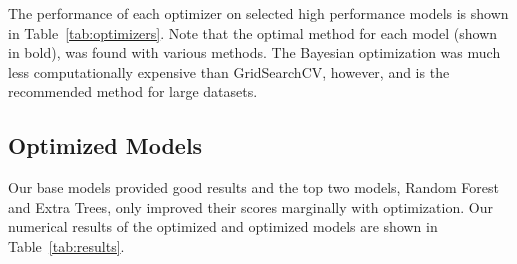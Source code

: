 \documentclass[twocolumn, nofootinbib, secnumarabic, amssymb, nobibnotes, aps, prd]{revtex4-2}
\begin{document}
The performance of each optimizer on selected high performance models is shown in Table~\ref{tab:optimizers}. Note that the optimal method for each model (shown in bold), was found with various methods. The Bayesian optimization was much less computationally expensive than GridSearchCV, however, and is the recommended method for large datasets.

\subsection{Optimized Models}\label{sec:optimized-models}

Our base models provided good results and the top two models, Random Forest and Extra Trees, only improved their scores marginally with optimization. Our numerical results of the optimized and optimized models are shown in Table~\ref{tab:results}.
\end{document}
